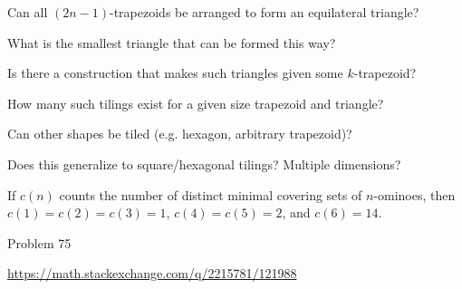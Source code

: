 \documentclass{article}
\begin{document}
\begin{question}
  Can all $(2n-1)$-trapezoids be arranged to form an equilateral triangle?
\end{question}

\begin{related}
  \item What is the smallest triangle that can be formed this way?
  \item Is there a construction that makes such triangles given some $k$-trapezoid?
  \item How many such tilings exist for a given size trapezoid and triangle?
  \item Can other shapes be tiled (e.g. hexagon, arbitrary trapezoid)?
  \item Does this generalize to square/hexagonal tilings? Multiple dimensions?
\end{related}

\begin{note}
  If $c(n)$ counts the number of distinct minimal covering sets of $n$-ominoes,
  then $c(1) = c(2) = c(3) = 1$, $c(4) = c(5) = 2$, and $c(6) = 14$.
\end{note}

\begin{references}
  \item Problem 75
  \item \url{https://math.stackexchange.com/q/2215781/121988}
\end{references}
\end{document}
